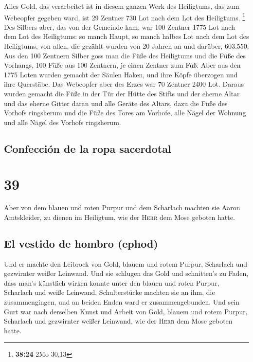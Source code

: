  Alles Gold, das verarbeitet ist in diesem ganzen Werk
des Heiligtums, das zum Webeopfer gegeben ward, ist 29 Zentner 730 Lot
nach dem Lot des Heiligtums. \footnote{\textbf{38:24} 2Mo 30,13}
 Des Silbers aber, das von der Gemeinde kam, war 100
Zentner 1775 Lot nach dem Lot des Heiligtums:  so manch
Haupt, so manch halbes Lot nach dem Lot des Heiligtums, von allen, die
gezählt wurden von 20 Jahren an und darüber, 603.550. 
Aus den 100 Zentnern Silber goss man die Füße des Heiligtums und die
Füße des Vorhangs, 100 Füße aus 100 Zentnern, je einen Zentner zum Fuß.
 Aber aus den 1775 Loten wurden gemacht der Säulen Haken,
und ihre Köpfe überzogen und ihre Querstäbe.  Das
Webeopfer aber des Erzes war 70 Zentner 2400 Lot.  Daraus
wurden gemacht die Füße in der Tür der Hütte des Stifts und der eherne
Altar und das eherne Gitter daran und alle Geräte des Altars,
 dazu die Füße des Vorhofs ringsherum und die Füße des
Tores am Vorhofe, alle Nägel der Wohnung und alle Nägel des Vorhofs
ringsherum.

\hypertarget{confecciuxf3n-de-la-ropa-sacerdotal}{%
\subsection{Confección de la ropa
sacerdotal}\label{confecciuxf3n-de-la-ropa-sacerdotal}}

\hypertarget{section-38}{%
\section{39}\label{section-38}}

 Aber von dem blauen und roten Purpur und dem Scharlach
machten sie Aaron Amtskleider, zu dienen im Heiligtum, wie der
\textsc{Herr} dem Mose geboten hatte.

\hypertarget{el-vestido-de-hombro-ephod-1}{%
\subsection{El vestido de hombro
(ephod)}\label{el-vestido-de-hombro-ephod-1}}

 Und er machte den Leibrock von Gold, blauem und rotem
Purpur, Scharlach und gezwirnter weißer Leinwand.  Und sie
schlugen das Gold und schnitten's zu Faden, dass man's künstlich wirken
konnte unter den blauen und roten Purpur, Scharlach und weiße Leinwand.
 Schulterstücke machten sie an ihm, die zusammengingen,
und an beiden Enden ward er zusammengebunden.  Und sein
Gurt war nach derselben Kunst und Arbeit von Gold, blauem und rotem
Purpur, Scharlach und gezwirnter weißer Leinwand, wie der \textsc{Herr}
dem Mose geboten hatte.

